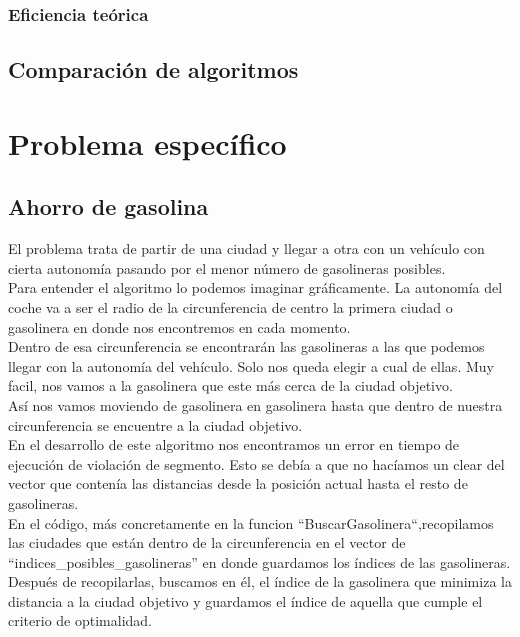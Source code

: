 \documentclass[11pt,a4paper]{article} %
\begin{document}
\subsubsection{Eficiencia teórica}


\newpage
\subsection{Comparación de algoritmos}


\newpage
\section{Problema específico}
\subsection{Ahorro de gasolina}
El problema trata de partir de una ciudad y llegar a otra con un vehículo con cierta autonomía pasando por el menor número de gasolineras posibles.\\

Para entender el algoritmo lo podemos imaginar gráficamente. La autonomía del coche va a ser el radio de la circunferencia de centro la primera ciudad o gasolinera en donde nos encontremos en cada momento.\\

Dentro de esa circunferencia se encontrarán las gasolineras a las que podemos llegar con la autonomía del vehículo. Solo nos queda elegir a cual de ellas. Muy facil, nos vamos a la gasolinera que este más cerca de la ciudad objetivo. \\

Así nos vamos moviendo de gasolinera en gasolinera hasta que dentro de nuestra circunferencia se encuentre a la ciudad objetivo.\\

En el desarrollo de este algoritmo nos encontramos un error en tiempo de ejecución de violación de segmento. Esto se debía a que no hacíamos un clear del vector que contenía las distancias desde la posición actual hasta el resto de gasolineras.\\

En el código, más concretamente en la funcion “BuscarGasolinera“,recopilamos las ciudades que están dentro de la circunferencia en el vector de “indices\_posibles\_gasolineras” en donde guardamos los índices de las gasolineras.\\

Después de recopilarlas, buscamos en él, el índice de la gasolinera que minimiza la distancia a la ciudad objetivo y guardamos el índice de aquella que cumple el criterio de optimalidad.\\
\end{document}
